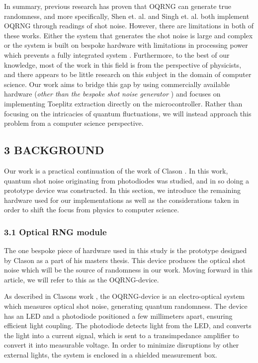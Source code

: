In summary, previous research has proven that OQRNG can generate true randomness, and more specifically, Shen et. al. \cite{contender1} and Singh et. al. \cite{singh} both implement OQRNG through readings of shot noise. However, there are limitations in both of these works. Either the system that generates the shot noise is large and complex \cite{contender1} or the system is built on bespoke hardware with limitations in processing power which prevents a fully integrated system \cite{singh}. Furthermore, to the best of our knowledge, most of the work in this field is from the perspective of physicists, and there appears to be little research on this subject in the domain of computer science. Our work aims to bridge this gap by using commercially available hardware (\emph{other than the bespoke shot noise generator \cite{Clason2023}}) and focuses on implementing Toeplitz extraction directly on the microcontroller. Rather than focusing on the intricacies of quantum fluctuations, we will instead approach this problem from a computer science perspective.

\subsection{3 BACKGROUND}\label{background}

Our work is a practical continuation of the work of Clason \cite{Clason2023}. In this work, quantum shot noise originating from photodiodes was studied, and in so doing a prototype device was constructed. In this section, we introduce the remaining hardware used for our implementations as well as the considerations taken in order to shift the focus from physics to computer science.

\subsubsection{3.1 Optical RNG module}\label{optical-rng-module}

The one bespoke piece of hardware used in this study is the prototype designed by Clason \cite{Clason2023} as a part of his masters thesis. This device produces the optical shot noise which will be the source of randomness in our work. Moving forward in this article, we will refer to this as the OQRNG-device.

As described in Clasons work \cite{Clason2023}, the OQRNG-device is an electro-optical system which measures optical shot noise, generating quantum randomness. The device has an LED and a photodiode positioned a few millimeters apart, ensuring efficient light coupling. The photodiode detects light from the LED, and converts the light into a current signal, which is sent to a transimpedance amplifier to convert it into measurable voltage. In order to minimize disruptions by other external lights, the system is enclosed in a shielded measurement box.

